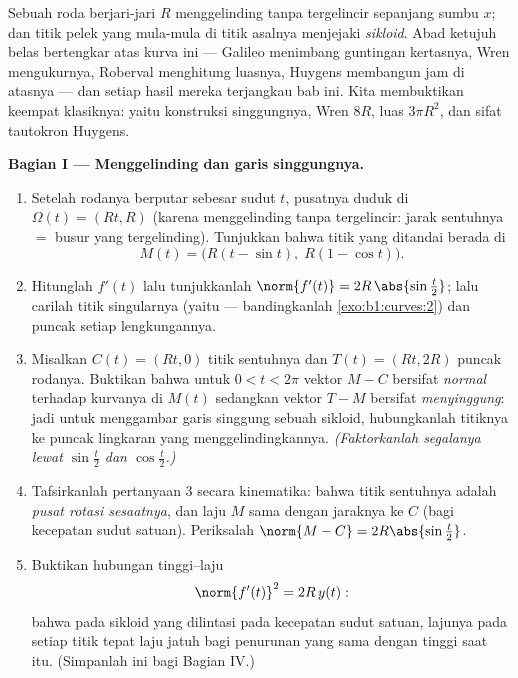 \begin{problem}\label{pb:b1:curves:1}
Sebuah roda berjari-jari $R$ menggelinding tanpa tergelincir sepanjang sumbu $x$;
dan titik pelek yang mula-mula di titik asalnya menjejaki
\emph{sikloid}. Abad ketujuh belas bertengkar atas kurva ini
--- Galileo menimbang guntingan kertasnya, Wren mengukurnya,
Roberval menghitung luasnya, Huygens membangun jam di atasnya --- dan
setiap hasil mereka terjangkau bab ini. Kita
membuktikan keempat klasiknya: yaitu konstruksi singgungnya,  Wren
$8R$, luas $3\pi R^2$, dan sifat tautokron
Huygens.

\medskip
\noindent\textbf{Bagian I --- Menggelinding dan garis singgungnya.}
\begin{enumerate}
  \item Setelah rodanya berputar sebesar sudut $t$, pusatnya
        duduk di $\Omega(t) = (Rt, R)$ (karena menggelinding tanpa tergelincir:
        jarak sentuhnya $=$ busur yang tergelinding). Tunjukkan bahwa titik
        yang ditandai berada di
        \[
        M(t) = \bigl(R(t - \sin t),\; R(1 - \cos t)\bigr).
        \]
  \item Hitunglah $f'(t)$ lalu tunjukkanlah $\norm{f'(t)} =
        2R\,\abs{\sin\frac t2}$; lalu carilah titik singularnya
        (yaitu  --- bandingkanlah \cref{exo:b1:curves:2}) dan puncak
        setiap lengkungannya.
  \item Misalkan $C(t) = (Rt, 0)$ titik sentuhnya dan $T(t) =
        (Rt, 2R)$ puncak rodanya. Buktikan bahwa untuk $0 < t <
        2\pi$ vektor $M - C$ bersifat \emph{normal} terhadap kurvanya di
        $M(t)$ sedangkan vektor $T - M$ bersifat \emph{menyinggung}: jadi untuk menggambar
        garis singgung sebuah sikloid, hubungkanlah titiknya ke puncak
        lingkaran yang menggelindingkannya. \emph{(Faktorkanlah segalanya lewat
        $\sin\frac t2$ dan $\cos\frac t2$.)}
  \item Tafsirkanlah pertanyaan 3 secara kinematika: bahwa titik sentuhnya adalah
        \emph{pusat rotasi sesaatnya}, dan
        laju $M$ sama dengan jaraknya ke $C$ (bagi kecepatan sudut
        satuan). Periksalah $\norm{M - C} = 2R\abs{\sin\frac t2}$.
  \item Buktikan hubungan tinggi--laju
        \[
        \norm{f'(t)}^2 = 2R\,y(t) :
        \]
        bahwa pada sikloid yang dilintasi pada kecepatan sudut satuan,
        lajunya pada setiap titik tepat laju jatuh  bagi
        penurunan yang sama dengan tinggi saat itu. (Simpanlah ini bagi
        Bagian IV.)
\end{enumerate}


\end{problem}
